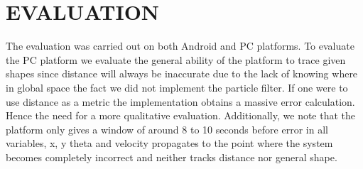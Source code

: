 \documentclass{acm_proc_article-sp}
\begin{document}
\section{EVALUATION} \label{evaluation}
The evaluation was carried out on both Android and PC platforms. To evaluate the PC platform we evaluate the general ability of the platform to trace given shapes since distance will always be inaccurate due to the lack of knowing where in global space the fact we did not implement the particle filter. If one were to use distance as a metric the implementation obtains a massive error calculation. Hence the need for a more qualitative evaluation. Additionally, we note that the platform only gives a window of around 8 to 10 seconds before error in all variables, x, y theta and velocity propagates to the point where the system becomes completely incorrect and neither tracks distance nor general shape.

\end{document}
